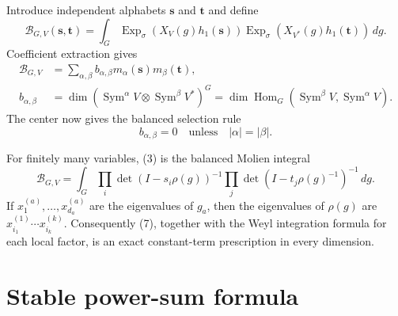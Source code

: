 \documentclass[11pt]{article}
\newcommand{\Sym}{\operatorname{Sym}}
\newcommand{\Hom}{\operatorname{Hom}}
\newcommand{\Exp}{\operatorname{Exp}_{\sigma}}
\begin{document}
Introduce independent alphabets $\mathbf s$ and $\mathbf t$ and define
\begin{equation}
 \mathcal B_{G,V}(\mathbf s,\mathbf t)
 =\int_G \Exp\!\left(X_V(g)h_1(\mathbf s)\right)
          \Exp\!\left(X_{V^*}(g)h_1(\mathbf t)\right)\,dg.
\end{equation}
Coefficient extraction gives
\begin{align}
 \mathcal B_{G,V}
 &=\sum_{\alpha,\beta}b_{\alpha,\beta}
          m_\alpha(\mathbf s)m_\beta(\mathbf t),\\
 b_{\alpha,\beta}
 &=\dim\left(\Sym^\alpha V\otimes\Sym^\beta V^*\right)^G
  =\dim\Hom_G(\Sym^\beta V,\Sym^\alpha V).
\end{align}
The center now gives the balanced selection rule
\begin{equation}
 \boxed{b_{\alpha,\beta}=0\quad\text{unless}\quad
 |\alpha|=|\beta|.}
\end{equation}

For finitely many variables, (3) is the balanced Molien integral
\begin{equation}
 \mathcal B_{G,V}
 =\int_G\prod_i\det(I-s_i\rho(g))^{-1}
         \prod_j\det(I-t_j\rho(g)^{-1})^{-1}\,dg.
\end{equation}
If $x^{(a)}_1,\ldots,x^{(a)}_{d_a}$ are the eigenvalues of $g_a$, then the
eigenvalues of $\rho(g)$ are $x^{(1)}_{i_1}\cdots x^{(k)}_{i_k}$.
Consequently (7), together with the Weyl integration formula for each local
factor, is an exact constant-term prescription in every dimension.

\section{Stable power-sum formula}
\end{document}
